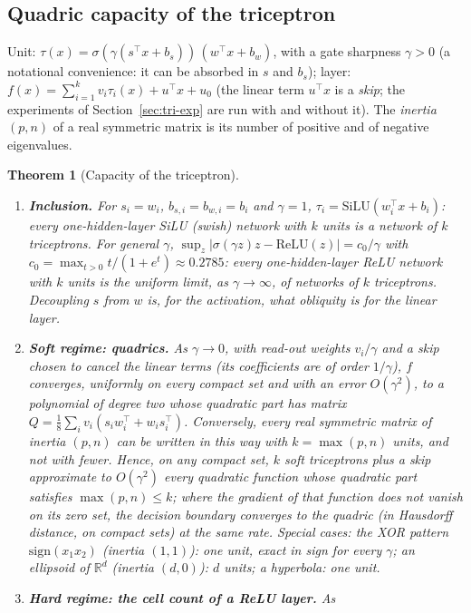 \documentclass[11pt,a4paper]{article}
\theoremstyle{plain}
\newtheorem{theorem}{Theorem}
\theoremstyle{definition}
\theoremstyle{remark}
\newcommand{\R}{\mathbb R}
\newcommand{\T}{\top}
\begin{document}
\subsection{Quadric capacity of the triceptron}
Unit: $\tau(x)=\sigma(\gamma(s^\T x+b_s))\,(w^\T x+b_w)$, with a gate
sharpness $\gamma>0$ (a notational convenience: it can be absorbed in $s$
and $b_s$); layer: $f(x)=\sum_{i=1}^kv_i\tau_i(x)+u^\T x+u_0$ (the linear
term $u^\T x$ is a \emph{skip}; the experiments of
Section~\ref{sec:tri-exp} are run with and without it). The \emph{inertia} $(p,n)$ of a real symmetric
matrix is its number of positive and of negative eigenvalues.
\begin{theorem}[Capacity of the triceptron]
\label{thm:B}
\begin{enumerate}
  \item[(i)] \textbf{Inclusion.} For $s_i=w_i$, $b_{s,i}=b_{w,i}=b_i$ and
  $\gamma=1$, $\tau_i=\mathrm{SiLU}(w_i^\T x+b_i)$: every one-hidden-layer
  SiLU (swish) network with $k$ units is a network of $k$ triceptrons. For
  general $\gamma$,
  $\sup_z|\sigma(\gamma z)z-\mathrm{ReLU}(z)|=c_0/\gamma$ with
  $c_0=\max_{t>0}t/(1+e^t)\approx0.2785$: every one-hidden-layer ReLU network
  with $k$ units is the uniform limit, as $\gamma\to\infty$, of networks of
  $k$ triceptrons. Decoupling $s$ from $w$ is, for the activation, what
  obliquity is for the linear layer.
  \item[(ii)] \textbf{Soft regime: quadrics.} As $\gamma\to0$, with read-out
  weights $v_i/\gamma$ and a skip chosen to cancel the linear terms (its
  coefficients are of order $1/\gamma$), $f$ converges, uniformly on every
  compact set and with an error $O(\gamma^2)$, to a polynomial of degree two
  whose quadratic part has matrix
  $Q=\tfrac18\sum_iv_i(s_iw_i^\T+w_is_i^\T)$. Conversely, every real
  symmetric matrix of inertia $(p,n)$ can be written in this way with
  $k=\max(p,n)$ units, and not with fewer. Hence, on any compact set, $k$
  soft triceptrons plus a skip approximate to $O(\gamma^2)$ every quadratic
  function whose quadratic part satisfies $\max(p,n)\le k$; where the
  gradient of that function does not vanish on its zero set, the decision
  boundary converges to the quadric (in Hausdorff distance, on compact sets)
  at the same rate. Special cases: the
  XOR pattern $\mathrm{sign}(x_1x_2)$ (inertia $(1,1)$): one unit, exact in
  sign for every $\gamma$; an ellipsoid of $\R^d$ (inertia $(d,0)$): $d$
  units; a hyperbola: one unit.
  \item[(iii)] \textbf{Hard regime: the cell count of a ReLU layer.} As

\end{enumerate}
\end{theorem}
\end{document}

